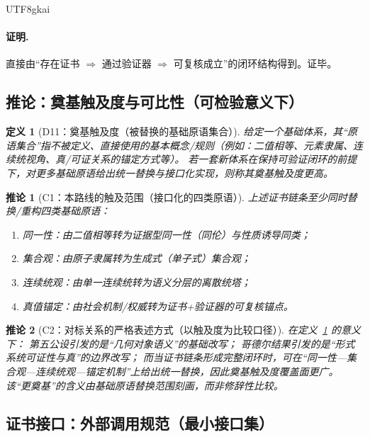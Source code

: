 \documentclass[12pt]{article}
\newtheorem{definition}{定义}[section]
\newtheorem{corollary}{推论}[section]
\begin{document}
\begin{CJK*}{UTF8}{gkai}
\paragraph{证明.}
直接由“存在证书 $\Rightarrow$ 通过验证器 $\Rightarrow$ 可复核成立”的闭环结构得到。证毕。

\subsection{推论：奠基触及度与可比性（可检验意义下）}
\label{subsec:tex19-appA-foundational-reach}

\begin{definition}[D11：奠基触及度（被替换的基础原语集合）]
\label{def:tex19-appA-D11-reach}
给定一个基础体系，其“原语集合”指不被定义、直接使用的基本概念/规则（例如：二值相等、元素隶属、连续统视角、真/可证关系的锚定方式等）。
若一套新体系在保持可验证闭环的前提下，对更多基础原语给出统一替换与接口化实现，则称其奠基触及度更高。
\end{definition}

\begin{corollary}[C1：本路线的触及范围（接口化的四类原语）]
\label{cor:tex19-appA-C1-reach}
上述证书链条至少同时替换/重构四类基础原语：
\begin{enumerate}
  \item 同一性：由二值相等转为证据型同一性（同伦）与性质诱导同类；
  \item 集合观：由原子隶属转为生成式（单子式）集合观；
  \item 连续统观：由单一连续统转为语义分层的离散统塔；
  \item 真值锚定：由社会机制/权威转为证书+验证器的可复核锚点。
\end{enumerate}
\end{corollary}

\begin{corollary}[C2：对标关系的严格表述方式（以触及度为比较口径）]
\label{cor:tex19-appA-C2-comparison}
在定义~\ref{def:tex19-appA-D11-reach} 的意义下：
第五公设引发的是“几何对象语义”的基础改写；
哥德尔结果引发的是“形式系统可证性与真”的边界改写；
而当证书链条形成完整闭环时，可在“同一性—集合观—连续统观—锚定机制”上给出统一替换，因此奠基触及度覆盖面更广。
该“更奠基”的含义由基础原语替换范围刻画，而非修辞性比较。
\end{corollary}

\subsection{证书接口：外部调用规范（最小接口集）}
\label{subsec:tex19-appA-external-interface}


\end{CJK*}
\end{document}
